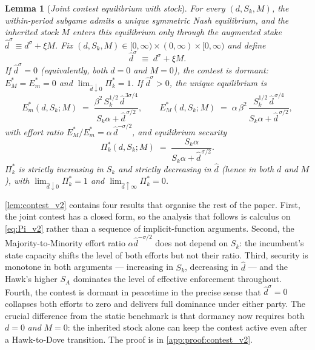 \documentclass[11pt,twoside]{extarticle}
\newtheorem{lemma}{Lemma}
\begin{document}
\begin{lemma}[\emph{Joint contest equilibrium with stock}]\label{lem:contest_v2}\label{lem:contest_equilibrium}
\emph{For every $(d,S_k,M)$, the within-period subgame admits a unique symmetric Nash equilibrium, and the inherited stock $M$ enters this equilibrium only through the augmented stake $\hat d^\sigma\equiv d^\sigma+\xi M$.}
Fix $(d,S_k,M)\in[0,\infty)\times(0,\infty)\times[0,\infty)$ and define
\begin{equation}\label{eq:dhat_v2}
    \hat d^\sigma\;\equiv\;d^\sigma+\xi M.
\end{equation}
If $\hat d^\sigma=0$ (equivalently, both $d=0$ and $M=0$), the contest is dormant: $E_M^*=E_m^*=0$ and $\lim_{\hat d\downarrow 0}\Pi_k^*=1$. If $\hat d^\sigma>0$, the unique equilibrium is
\begin{equation}\label{eq:Em_Sk_explicit}
    E_m^*(d,S_k;M)\;=\;\frac{\beta^2\,S_k^{1/2}\,\hat d^{\,3\sigma/4}}{S_k\alpha+\hat d^{\,\sigma/2}},
    \qquad
    E_M^*(d,S_k;M)\;=\;\alpha\,\beta^2\,\frac{S_k^{1/2}\,\hat d^{\,\sigma/4}}{S_k\alpha+\hat d^{\,\sigma/2}},
\end{equation}
with effort ratio $E_M^*/E_m^*=\alpha\,\hat d^{-\sigma/2}$, and equilibrium security
\begin{equation}\label{eq:Pi_v2}
    \Pi_k^*(d,S_k;M)\;=\;\frac{S_k\alpha}{S_k\alpha+\hat d^{\,\sigma/2}}.
\end{equation}
$\Pi_k^*$ is strictly increasing in $S_k$ and strictly decreasing in $\hat d$ (hence in both $d$ and $M$), with $\lim_{\hat d\downarrow 0}\Pi_k^*=1$ and $\lim_{\hat d\uparrow\infty}\Pi_k^*=0$.
\end{lemma}

\autoref{lem:contest_v2} contains four results that organise the rest of the paper. First, the joint contest has a closed form, so the analysis that follows is calculus on \autoref{eq:Pi_v2} rather than a sequence of implicit-function arguments. Second, the Majority-to-Minority effort ratio $\alpha\hat d^{-\sigma/2}$ does not depend on $S_k$: the incumbent's state capacity shifts the level of both efforts but not their ratio. Third, security is monotone in both arguments — increasing in $S_k$, decreasing in $\hat d$ — and the Hawk's higher $S_A$ dominates the level of effective enforcement throughout. Fourth, the contest is dormant in peacetime in the precise sense that $\hat d^\sigma=0$ collapses both efforts to zero and delivers full dominance under either party. The crucial difference from the static benchmark is that dormancy now requires both $d=0$ \emph{and} $M=0$: the inherited stock alone can keep the contest active even after a Hawk-to-Dove transition. The proof is in \autoref{app:proof:contest_v2}.
\end{document}
